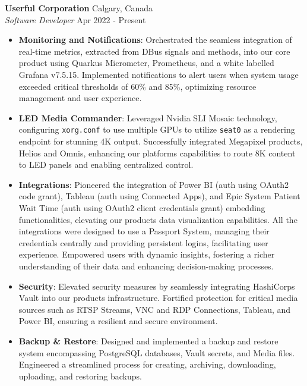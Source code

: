 \documentclass[a4paper]{article}
\newcommand{\resumeItemExperience}[2]{
  \item{
    \begin{justify}
    \setlength{\rightskip}{0.15in} \textbf{#1}{: #2 \vspace{-2pt}}
    \end{justify}
  }
}
\begin{document}
\textbf{Userful Corporation} \hfill Calgary, Canada\\
\textit{Software Developer} \hfill Apr 2022 - Present\\
\vspace{-1mm}
\begin{itemize} \itemsep 1pt
    \resumeItemExperience {Monitoring and Notifications}{Orchestrated the seamless integration of real-time metrics, extracted from DBus signals and methods, into our core product using Quarkus Micrometer, Prometheus, and a white labelled Grafana v7.5.15. Implemented notifications to alert users when system usage exceeded critical thresholds of 60\% and 85\%, optimizing resource management and user experience.}

    \resumeItemExperience {LED Media Commander} {Leveraged Nvidia SLI Mosaic technology, configuring \texttt{xorg.conf} to use multiple GPUs to utilize \texttt{seat0} as a rendering endpoint for stunning 4K output. Successfully integrated Megapixel products, Helios and Omnis, enhancing our platform\textquotesingle{}s capabilities to route 8K content to LED panels and enabling centralized control.}

    \resumeItemExperience{Integrations} {Pioneered the integration of Power BI (auth using OAuth2 code grant), Tableau (auth using Connected Apps), and Epic System Patient Wait Time (auth using OAuth2 client credentials grant) embedding functionalities, elevating our product\textquotesingle{}s data visualization capabilities. All the integrations were designed to use a \textquotesingle{}Passport System\textquotesingle{}, managing their credentials centrally and providing persistent logins, facilitating user experience. Empowered users with dynamic insights, fostering a richer understanding of their data and enhancing decision-making processes.}

    \resumeItemExperience{Security} {Elevated security measures by seamlessly integrating HashiCorp\textquotesingle{}s Vault into our product\textquotesingle{}s infrastructure. Fortified protection for critical media sources such as RTSP Streams, VNC and RDP Connections, Tableau, and Power BI, ensuring a resilient and secure environment.}

    \resumeItemExperience{Backup \& Restore} {Designed and implemented a backup and restore system encompassing PostgreSQL databases, Vault secrets, and Media files. Engineered a streamlined process for creating, archiving, downloading, uploading, and restoring backups.}
\end{itemize}
\end{document}
